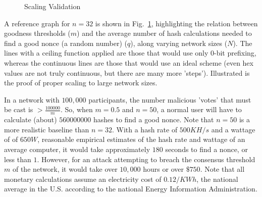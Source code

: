 \documentclass[10pt]{IEEEtran}
\begin{document}
\begin{figure}
\caption{Scaling Validation}
\label{fig_tryGraph}
\end{figure}

\par A reference graph for $n = 32$ is shown in Fig.~\ref{fig_tryGraph}, highlighting the relation between goodness thresholds ($m$) and the average number of hash calculations needed to find a good nonce (a random number) ($q$), along varying network sizes ($N$). The lines with a ceiling function applied are those that would use only $0$-bit prefixing, whereas the continuous lines are those that would use an ideal scheme (even hex values are not truly continuous, but there are many more 'steps'). Illustrated is the proof of proper scaling to large network sizes. 

\par In a network with $100,000$ participants, the number malicious 'votes' that must be cast is $ > \frac{100000}{m}$. So, when $m = 0.5$ and $n = 50$, a normal user will have to calculate (about) $560000000$ hashes to find a good nonce. Note that $n = 50$ is a more realistic baseline than $n = 32$. With a hash rate of $500KH/s$ and a wattage of of $650W$, reasonable empirical estimates of the hash rate and wattage of an average computer, it would take approximately $180$ seconds to find a nonce, or less than $1$\textcent. However, for an attack attempting to breach the consensus threshold $m$ of the network, it would take over $10,000$ hours or over $\$750$. Note that all monetary calculations assume an electricity cost of $0.12/KWh$, the national average in the U.S. according to the national Energy Information Administration.
\end{document}

